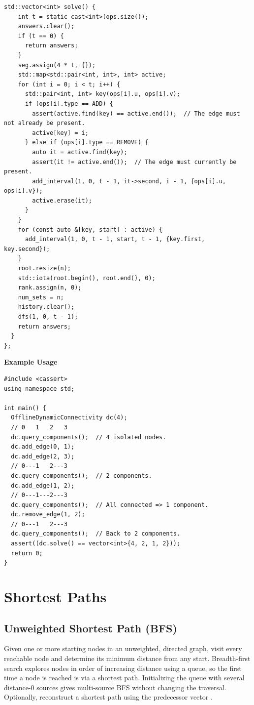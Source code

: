 \begin{lstlisting}[style=cpp]
  std::vector<int> solve() {
    int t = static_cast<int>(ops.size());
    answers.clear();
    if (t == 0) {
      return answers;
    }
    seg.assign(4 * t, {});
    std::map<std::pair<int, int>, int> active;
    for (int i = 0; i < t; i++) {
      std::pair<int, int> key(ops[i].u, ops[i].v);
      if (ops[i].type == ADD) {
        assert(active.find(key) == active.end());  // The edge must not already be present.
        active[key] = i;
      } else if (ops[i].type == REMOVE) {
        auto it = active.find(key);
        assert(it != active.end());  // The edge must currently be present.
        add_interval(1, 0, t - 1, it->second, i - 1, {ops[i].u, ops[i].v});
        active.erase(it);
      }
    }
    for (const auto &[key, start] : active) {
      add_interval(1, 0, t - 1, start, t - 1, {key.first, key.second});
    }
    root.resize(n);
    std::iota(root.begin(), root.end(), 0);
    rank.assign(n, 0);
    num_sets = n;
    history.clear();
    dfs(1, 0, t - 1);
    return answers;
  }
};
\end{lstlisting}
\textbf{Example Usage}\par
\begin{lstlisting}[style=cpp]
#include <cassert>
using namespace std;

int main() {
  OfflineDynamicConnectivity dc(4);
  // 0   1   2   3
  dc.query_components();  // 4 isolated nodes.
  dc.add_edge(0, 1);
  dc.add_edge(2, 3);
  // 0---1   2---3
  dc.query_components();  // 2 components.
  dc.add_edge(1, 2);
  // 0---1---2---3
  dc.query_components();  // All connected => 1 component.
  dc.remove_edge(1, 2);
  // 0---1   2---3
  dc.query_components();  // Back to 2 components.
  assert((dc.solve() == vector<int>{4, 2, 1, 2}));
  return 0;
}
\end{lstlisting}

\section{\texorpdfstring{Shortest Paths}{4.3 Shortest Paths}}
\setcounter{section}{3}
\setcounter{subsection}{0}
\subsection{Unweighted Shortest Path (BFS)}
\label{sec:4.3.1}
Given one or more starting nodes in an unweighted, directed graph, visit every reachable node and determine its minimum distance from any start. Breadth-first search explores nodes in order of increasing distance using a queue, so the first time a node is reached is via a shortest path. Initializing the queue with several distance-$0$ sources gives multi-source BFS without changing the traversal. Optionally, reconstruct a shortest path using the predecessor vector .

